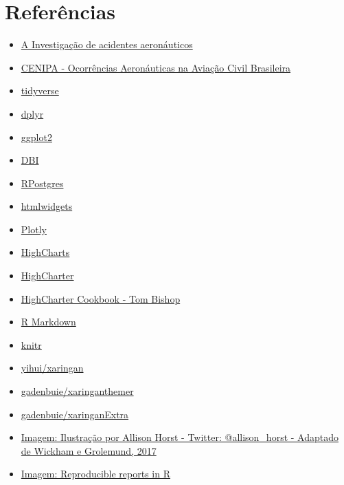 \documentclass[
]{article}
\providecommand{\tightlist}{%
  \setlength{\itemsep}{0pt}\setlength{\parskip}{0pt}}
\begin{document}
\hypertarget{referuxeancias}{%
\section{Referências}\label{referuxeancias}}

\begin{itemize}
\tightlist
\item
  \href{https://www3.fmb.unesp.br/sete/pluginfile.php/20354/mod_page/content/2/A_Investigacao_de_acidentes_aeronauticos_Conforme_a_Lei_no_7.pdf}{A
  Investigação de acidentes aeronáuticos}
\item
  \href{https://dados.gov.br/dataset/ocorrencias-aeronauticas-da-aviacao-civil-brasileira}{CENIPA
  - Ocorrências Aeronáuticas na Aviação Civil Brasileira}
\item
  \href{https://www.tidyverse.org/}{tidyverse}
\item
  \href{https://dplyr.tidyverse.org/}{dplyr}
\item
  \href{https://ggplot2.tidyverse.org/}{ggplot2}
\item
  \href{https://dbi.r-dbi.org/}{DBI}
\item
  \href{https://rpostgres.r-dbi.org/}{RPostgres}
\item
  \href{http://www.htmlwidgets.org/index.html}{htmlwidgets}
\item
  \href{https://plot.ly/r}{Plotly}
\item
  \href{https://www.highcharts.com/}{HighCharts}
\item
  \href{http://jkunst.com/highcharter/}{HighCharter}
\item
  \href{https://www.tmbish.me/lab/highcharter-cookbook/}{HighCharter
  Cookbook - Tom Bishop}
\item
  \href{https://rmarkdown.rstudio.com}{R Markdown}
\item
  \href{http://yihui.name/knitr}{knitr}
\item
  \href{https://github.com/yihui/xaringan}{yihui/xaringan}
\item
  \href{https://github.com/gadenbuie/xaringanthemer}{gadenbuie/xaringanthemer}
\item
  \href{https://github.com/gadenbuie/xaringanExtra}{gadenbuie/xaringanExtra}
\item
  \href{https://r-ladies-sao-paulo.github.io/xaringan/slides.html\#7}{Imagem:
  Ilustração por Allison Horst - Twitter: @allison\_horst - Adaptado de
  Wickham e Grolemund, 2017}
\item
  \href{https://hbctraining.github.io/In-depth-NGS-Data-Analysis-Course/sessionVI/lessons/knitr_rmarkdown.html}{Imagem:
  Reproducible reports in R}
\end{itemize}
\end{document}
